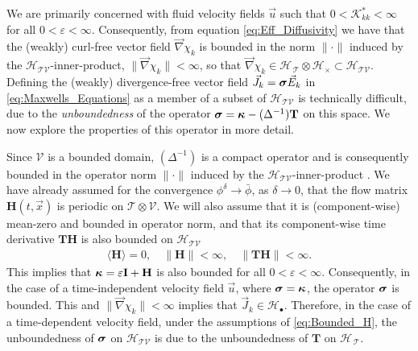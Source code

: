 \documentclass[11pt]{amsart}
\newcommand{\Tb}{\mathbf{T}}
\newcommand{\Hb}{\mathbf{H}}
\newcommand{\Ib}{\mathbf{I}}
\newcommand{\Kc}{\mathcal{K}}
\newcommand{\Tc}{\mathcal{T}}
\newcommand{\Vc}{\mathcal{V}}
\newcommand{\Hs}{\mathscr{H}}
\newcommand\bsig{\mbox{\boldmath${\sigma}$}}
\newcommand\bkappa{\mbox{\boldmath${\kappa}$}}
\begin{document}
We are primarily concerned with fluid velocity fields $\vec{u}$ such
that $0<\Kc^*_{kk}<\infty$ for all $0<\varepsilon<\infty$. Consequently, from equation
\eqref{eq:Eff_Diffusivity} we have that the (weakly)
curl-free vector field $\vec{\nabla}\chi_k$ is bounded in the norm $\|\cdot\|$
induced by the $\Hs_{\Tc\Vc}$-inner-product, $\|\vec{\nabla}\chi_k\|<\infty$, so that  
$\vec{\nabla}\chi_k\in\Hs_{\,\Tc}\otimes\Hs_\times\subset\Hs_{\Tc\Vc}$. Defining the (weakly)
divergence-free vector field $\vec{J}_k=\bsig\vec{E}_k$ in
\eqref{eq:Maxwells_Equations} as a member of a subset of
$\Hs_{\Tc\Vc}$ is technically difficult, due to the
\emph{unboundedness} of the operator $\bsig=\bkappa-(\Delta^{-1})\Tb$ on
this space. We now explore the properties of this operator in more
detail. 





Since $\Vc$ is a bounded domain, $(\Delta^{-1})$ is a compact operator
\cite{Stakgold:BVP:2000} and is consequently bounded in the operator
norm $\|\cdot\|$ induced by the $\Hs_{\Tc\Vc}$-inner-product
\cite{Reed-1980,Stone:64,Stakgold:BVP:2000}.  We have already assumed
for the convergence $\phi^\delta\to\bar{\phi}$, as $\delta\to0$, that the flow matrix 
$\Hb(t,\vec{x})$ is periodic on $\Tc\otimes\Vc$. We will also assume that it
is (component-wise) mean-zero and bounded in operator norm, and that its
component-wise time derivative $\Tb\Hb$ is also bounded on $\Hs_{\Tc\Vc}$
%
\begin{align}\label{eq:Bounded_H}
  \langle\Hb\rangle=0, \quad \|\Hb\|<\infty, \quad \|\Tb\Hb\|<\infty.
\end{align}
%
This implies that $\bkappa=\varepsilon\Ib+\Hb$ is also bounded for all
$0<\varepsilon<\infty$. Consequently, in the case of a time-independent velocity 
field $\vec{u}$, where $\bsig=\bkappa$, the operator $\bsig$ is
bounded. This and $\|\vec{\nabla}\chi_k\|<\infty$ implies that
$\vec{J}_k\in\Hs_\bullet$. Therefore, in the case of a time-dependent velocity
field, under the assumptions of \eqref{eq:Bounded_H}, the
unboundedness of $\bsig$ on $\Hs_{\Tc\Vc}$  is due to the
unboundedness of $\Tb$ on $\Hs_{\,\Tc}$.   
\end{document}
